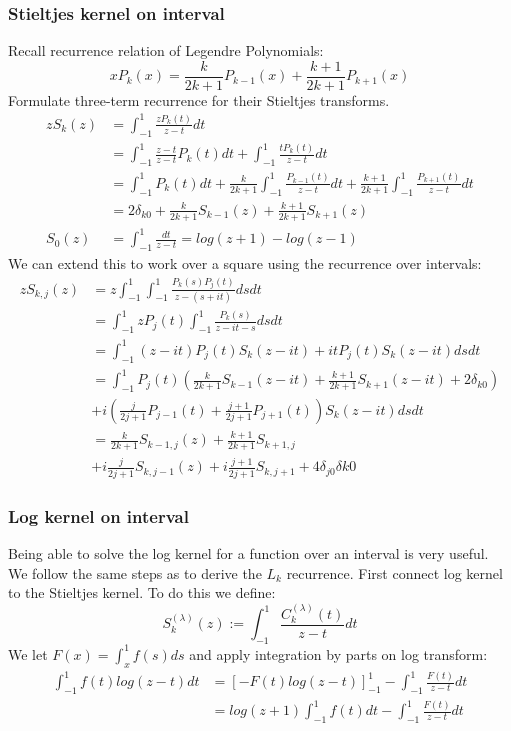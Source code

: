 \documentclass{article}
\begin{document}
\subsubsection{Stieltjes kernel on interval}
Recall recurrence relation of Legendre Polynomials:
\begin{equation}\label{legendre recurrence}
	xP_k(x) = \frac{k}{2k+1}P_{k-1}(x) + \frac{k+1}{2k+1}P_{k+1}(x)
\end{equation}
Formulate three-term recurrence for their Stieltjes transforms.
\begin{equation}
\begin{split}
	zS_k(z) &= \int_{-1}^{1}\frac{zP_k(t)}{z-t}dt \\
	&= \int_{-1}^{1}\frac{z-t}{z-t}P_k(t)dt+\int_{-1}^{1}\frac{tP_k(t)}{z-t}dt \\
	&= \int_{-1}^{1}P_k(t)dt+\frac{k}{2k+1}\int_{-1}^{1}\frac{P_{k-1}(t)}{z-t}dt+\frac{k+1}{2k+1}\int_{-1}^{1}\frac{P_{k+1}(t)}{z-t}dt \\
	&= 2\delta_{k0}+\frac{k}{2k+1}S_{k-1}(z)+\frac{k+1}{2k+1}S_{k+1}(z) \\
	S_0(z) &= \int_{-1}^{1}\frac{dt}{z-t} = log(z+1)-log(z-1)
\end{split}
\end{equation}
We can extend this to work over a square using the recurrence over intervals:
\begin{equation}
\begin{split}
zS_{k,j}(z) &= z\int_{-1}^1\int_{-1}^1\frac{P_k(s)P_j(t)}{z-(s+it)}dsdt \\
&= \int_{-1}^1zP_j(t)\int_{-1}^1\frac{P_k(s)}{z-it-s}dsdt \\
&= \int_{-1}^1(z-it)P_j(t)S_k(z-it)+itP_j(t)S_k(z-it)dsdt \\
&= \int_{-1}^1P_j(t)(\frac{k}{2k+1}S_{k-1}(z-it)+\frac{k+1}{2k+1}S_{k+1}(z-it)+2\delta_{k0}) \\
&+i(\frac{j}{2j+1}P_{j-1}(t)+\frac{j+1}{2j+1}P_{j+1}(t))S_k(z-it)dsdt \\
&= \frac{k}{2k+1}S_{k-1,j}(z)+\frac{k+1}{2k+1}S_{k+1,j} \\
&+i\frac{j}{2j+1}S_{k,j-1}(z)+i\frac{j+1}{2j+1}S_{k,j+1}+4\delta_{j0}\delta{k0}
\end{split}
\end{equation}
\subsubsection{Log kernel on interval}
Being able to solve the log kernel for a function over an interval is very useful.
We follow the same steps as \cite{logkernel} to derive the $L_k$ recurrence.
First connect log kernel to the Stieltjes kernel.
To do this we define:$$S_k^{(\lambda)}(z):=\int_{-1}^{1}\frac{C_k^{(\lambda)}(t)}{z-t}dt$$
We let $F(x) = \int_x^1f(s)ds$ and apply integration by parts on log transform:
\begin{equation}
\begin{split}
	\int_{-1}^1f(t)log(z-t)dt &= [-F(t)log(z-t)]_{-1}^1-\int_{-1}^1\frac{F(t)}{z-t}dt \\
	&= log(z+1)\int_{-1}^1f(t)dt-\int_{-1}^1\frac{F(t)}{z-t}dt
\end{split}
\end{equation}
\end{document}
